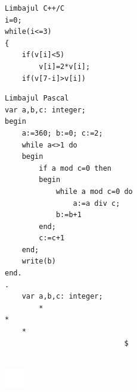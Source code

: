 \documentclass[10pt]{article}
\begin{document}
\begin{verbatim}
Limbajul C++/C
i=0;
while(i<=3)
{
    if(v[i]<5)
        v[i]=2*v[i];
    if(v[7-i]>v[i])
\end{verbatim}

\begin{verbatim}
Limbajul Pascal
var a,b,c: integer;
begin
    a:=360; b:=0; c:=2;
    while a<>1 do
    begin
        if a mod c=0 then
        begin
            while a mod c=0 do
                a:=a div c;
            b:=b+1
        end;
        c:=c+1
    end;
    write(b)
end.
.
    var a,b,c: integer;
        *
*
    *
                            $
\end{verbatim}

$\qquad$\\
\includegraphics[max width=\textwidth, center]{2025_04_17_46e04c6acd873ea9558dg-142(2)}\\
\end{document}
